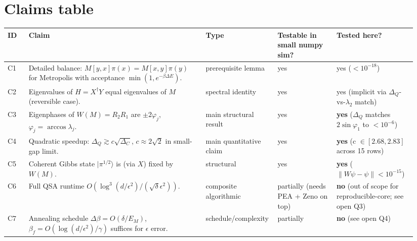 \documentclass[11pt]{article}
\begin{document}
\section{Claims table}
\begin{longtable}{@{}p{0.05\linewidth} p{0.42\linewidth} p{0.14\linewidth} p{0.14\linewidth} p{0.19\linewidth}@{}}
\toprule
\textbf{ID} & \textbf{Claim} & \textbf{Type} & \textbf{Testable in small numpy sim?} & \textbf{Tested here?} \\
\midrule
C1 & Detailed balance: $M[y,x]\pi(x) = M[x,y]\pi(y)$ for Metropolis with acceptance $\min(1, e^{-\beta\Delta E})$. & prerequisite lemma & yes & yes ($< 10^{-18}$) \\
C2 & Eigenvalues of $H = X^\dagger Y$ equal eigenvalues of $M$ (reversible case). & spectral identity & yes & yes (implicit via $\Delta_Q$-vs-$\lambda_2$ match) \\
C3 & Eigenphases of $W(M) = R_2 R_1$ are $\pm 2\varphi_j$, $\varphi_j = \arccos\lambda_j$. & main structural result & yes & \textbf{yes} ($\Delta_Q$ matches $2\sin\varphi_1$ to $< 10^{-6}$) \\
C4 & Quadratic speedup: $\Delta_Q \gtrsim c\sqrt{\Delta_C}$, $c \approx 2\sqrt{2}$ in small-gap limit. & main quantitative claim & yes & \textbf{yes} (c $\in [2.68, 2.83]$ across 15 rows) \\
C5 & Coherent Gibbs state $|\pi^{1/2}\rangle$ is (via $X$) fixed by $W(M)$. & structural & yes & \textbf{yes} ($\|W\psi - \psi\| < 10^{-15}$) \\
C6 & Full QSA runtime $O(\log^3(d/\epsilon^2)/(\sqrt\delta\epsilon^2))$. & composite algorithmic & partially (needs PEA + Zeno on top) & \textbf{no} (out of scope for reproducible-core; see open Q3) \\
C7 & Annealing schedule $\Delta\beta = O(\delta/E_M)$, $\beta_f = O(\log(d/\epsilon^2)/\gamma)$ suffices for $\epsilon$ error. & schedule/complexity & partially & \textbf{no} (see open Q4) \\
\bottomrule
\end{longtable}
\end{document}
